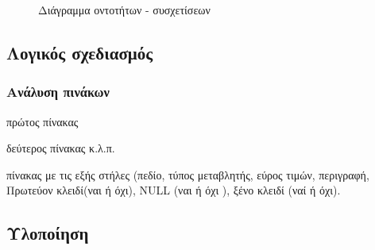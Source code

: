 \documentclass{assignment}
\begin{document}
\begin{landscape}
\begin{figure}
\begin{center}
\caption{Διάγραμμα οντοτήτων - συσχετίσεων}
\label{fig:ER:diagram}
\end{center}
\end{figure}
\end{landscape}

\subsection{Λογικός σχεδιασμός}

\subsubsection{Ανάλυση πινάκων}

πρώτος πίνακας

δεύτερος πίνακας κ.λ.π.

πίνακας με τις εξής στήλες (πεδίο, τύπος μεταβλητής, εύρος τιμών, περιγραφή, Πρωτεύον κλειδί(ναι ή όχι), NULL (ναι ή όχι ), ξένο κλειδί (ναί ή όχι).

\subsection{Υλοποίηση}

 \label{Βιβλιογραφία}



\newpage
\end{document}
